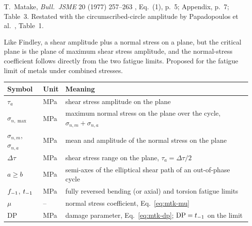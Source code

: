 \label{sheet:MATAKE}

 T.~Matake, \emph{Bull.\ JSME} 20 (1977) 257--263 \cite{matake1977}, Eq.~(1), p.~5;
Appendix, p.~7; Table~3. Restated with the circumscribed-circle amplitude by Papadopoulos et al.\
\cite{papadopoulos1997}, Table~1.

 Like Findley, a shear amplitude plus a normal stress on a plane, but the
critical plane is the plane of maximum shear stress amplitude, and the normal-stress coefficient
follows directly from the two fatigue limits. Proposed for the fatigue limit of metals under
combined stresses.

\begin{center}\small
\begin{tabular}{@{}llp{100mm}@{}}
\toprule
Symbol & Unit & Meaning\\\midrule
$\tau_a$ & MPa & shear stress amplitude on the plane\\
$\sigma_{n,\max}$ & MPa & maximum normal stress on the plane over the cycle, $\sigma_{n,m}+\sigma_{n,a}$\\
$\sigma_{n,m}$, $\sigma_{n,a}$ & MPa & mean and amplitude of the normal stress on the plane\\
$\Delta\tau$ & MPa & shear stress range on the plane, $\tau_a=\Delta\tau/2$\\
$a\ge b$ & MPa & semi-axes of the elliptical shear path of an out-of-phase cycle\\
$f_{-1}$, $t_{-1}$ & MPa & fully reversed bending (or axial) and torsion fatigue limits\\
$\mu$ & -- & normal stress coefficient, Eq.~\eqref{eq:mtk-mu}\\
$\mathrm{DP}$ & MPa & damage parameter, Eq.~\eqref{eq:mtk-dp}; $\mathrm{DP}=t_{-1}$ on the limit\\
\bottomrule
\end{tabular}
\end{center}

